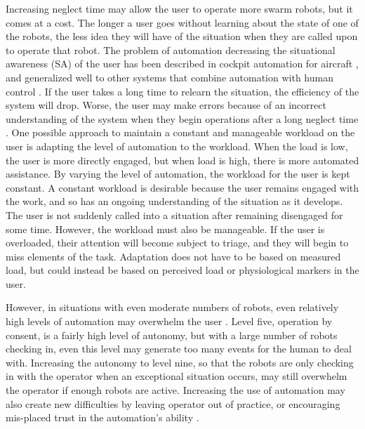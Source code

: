 Increasing neglect time may allow the user to operate more swarm robots, but it comes at a cost. 
The longer a user goes without learning about the state of one of the robots, the less idea they will have of the situation when they are called upon to operate that robot. 
The problem of automation decreasing the situational awareness (SA) of the user has been described in cockpit automation for aircraft \citep{wiener1980flight}, and generalized well to other systems that combine automation with human control \citep{kaber1997out}. 
If the user takes a long time to relearn the situation, the efficiency of the system will drop. 
Worse, the user may make errors because of an incorrect understanding of the system when they begin operations after a long neglect time \citep{cummings2008predicting}. 
One possible approach to maintain a constant and manageable workload on the user is adapting the level of automation to the workload. 
When the load is low, the user is more directly engaged, but when load is high, there is more automated assistance. 
By varying the level of automation, the workload for the user is kept constant. 
A constant workload is desirable because the user remains engaged with the work, and so has an ongoing understanding of the situation as it develops. 
The user is not suddenly called into a situation after remaining disengaged for some time. 
However, the workload must also be manageable. 
If the user is overloaded, their attention will become subject to triage, and they will begin to miss elements of the task. 
Adaptation does not have to be based on measured load, but could instead be based on perceived load or physiological markers in the user. 

However, in situations with even moderate numbers of robots, even relatively high levels of automation may overwhelm the user \citep{lewis200617}. 
Level five, operation by consent, is a fairly high level of autonomy, but with a large number of robots checking in, even this level may generate too many events for the human to deal with. 
Increasing the autonomy to level nine, so that the robots are only checking in with the operator when an exceptional situation occurs, may still overwhelm the operator if enough robots are active.
Increasing the use of automation may also create new difficulties by leaving operator out of practice, or encouraging mis-placed trust in the automation's ability \citep{lee2004trust}. 

